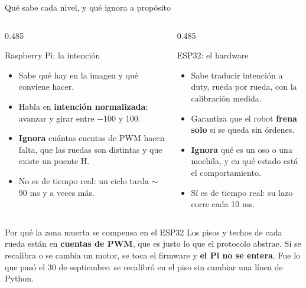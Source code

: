 \begin{frame}{Qué sabe cada nivel, y qué ignora a propósito}
  \begin{columns}[T,onlytextwidth]
    \begin{column}{0.485\textwidth}
      \begin{block}{Raspberry Pi: la intención}
        \begin{itemize}
          \item Sabe qué hay en la imagen y qué conviene hacer.
          \item Habla en \textbf{intención normalizada}: avanzar y girar entre
                $-100$ y $100$.
          \item \textbf{Ignora} cuántas cuentas de PWM hacen falta, que las
                ruedas son distintas y que existe un puente H.
          \item No es de tiempo real: un ciclo tarda $\sim$90 ms y a veces más.
        \end{itemize}
      \end{block}
    \end{column}
    \begin{column}{0.485\textwidth}
      \begin{block}{ESP32: el hardware}
        \begin{itemize}
          \item Sabe traducir intención a duty, rueda por rueda, con la
                calibración medida.
          \item Garantiza que el robot \textbf{frena solo} si se queda sin
                órdenes.
          \item \textbf{Ignora} qué es un oso o una mochila, y en qué estado
                está el comportamiento.
          \item Sí es de tiempo real: su lazo corre cada 10 ms.
        \end{itemize}
      \end{block}
    \end{column}
  \end{columns}

  \vspace{0.5em}
  \begin{exampleblock}{Por qué la zona muerta se compensa en el ESP32}
    {\small Los pisos y techos de cada rueda están en \textbf{cuentas de PWM}, que es
    justo lo que el protocolo abstrae. Si se recalibra o se cambia un motor, se
    toca el firmware y \textbf{el Pi no se entera}. Fue lo que pasó el 30 de
    septiembre: se recalibró en el piso sin cambiar una línea de Python.}
  \end{exampleblock}
\end{frame}

